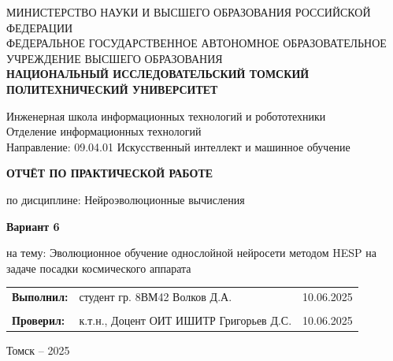 \documentclass[a4paper,12pt]{article}
\begin{document}
\begin{titlepage}
	\vspace*{1cm}
	{\small
		\begin{center}
			МИНИСТЕРСТВО НАУКИ И ВЫСШЕГО ОБРАЗОВАНИЯ РОССИЙСКОЙ ФЕДЕРАЦИИ\\
			ФЕДЕРАЛЬНОЕ ГОСУДАРСТВЕННОЕ АВТОНОМНОЕ ОБРАЗОВАТЕЛЬНОЕ УЧРЕЖДЕНИЕ ВЫСШЕГО ОБРАЗОВАНИЯ\\
			\textbf{НАЦИОНАЛЬНЫЙ ИССЛЕДОВАТЕЛЬСКИЙ ТОМСКИЙ ПОЛИТЕХНИЧЕСКИЙ УНИВЕРСИТЕТ}
		\end{center}
	}
	\vspace{0.5cm}
	\begin{center}
		Инженерная школа информационных технологий и робототехники\\
		Отделение информационных технологий\\
		Направление: 09.04.01 Искусственный интеллект и машинное обучение
	\end{center}
	\vspace{1cm}
	\begin{center}
		\textbf{ОТЧЁТ ПО ПРАКТИЧЕСКОЙ РАБОТЕ}
	\end{center}
	\begin{center}
		по дисциплине: Нейроэволюционные вычисления
	\end{center}
	\vspace{0.5cm}
	\begin{center}
		\textbf{Вариант 6}
	\end{center}
	\begin{center}
		на тему: Эволюционное обучение однослойной нейросети методом HESP на задаче посадки космического аппарата
	\end{center}
	\vspace{1cm}
	
	\begin{tabular}{p{} p{} p{}}
		\textbf{Выполнил:} & студент гр. 8ВМ42 \newline Волков Д.А. & 10.06.2025 \\
		& & \\
		\textbf{Проверил:} & к.т.н., Доцент ОИТ ИШИТР \newline Григорьев Д.С. & 10.06.2025
	\end{tabular}
	\vfill
	\begin{center}
		Томск – 2025
	\end{center}
\end{titlepage}


\tableofcontents
\setcounter{page}{2}
\newpage
\end{document}

